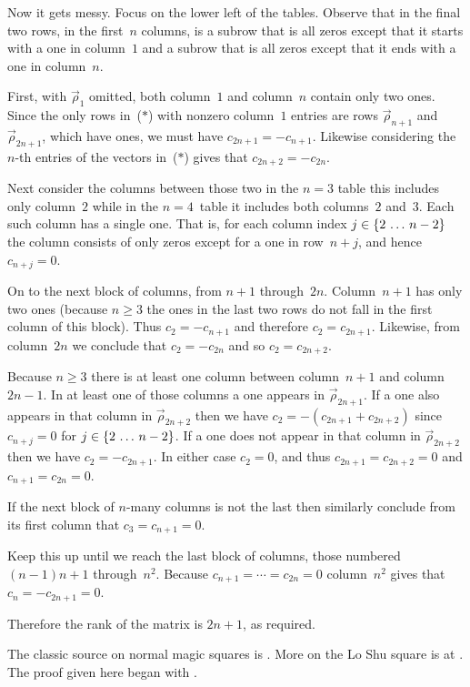 Now it gets messy.
Focus on the lower left of the tables.
Observe that in the final two rows, in the first~$n$ columns, is a subrow that 
is all zeros except that it starts with a one in column~$1$
and a subrow that is all zeros except that it ends with a one
in column~$n$.

First, with $\vec{\rho}_1$ omitted, both column~$1$ and column~$n$ contain only 
two ones.
Since the only rows in~($*$) with nonzero column~$1$ entries 
are rows $\vec{\rho}_{n+1}$ and $\vec{\rho}_{2n+1}$, which have ones, 
we must have $c_{2n+1}=-c_{n+1}$.
Likewise considering the $n$-th entries of the vectors in~($*$) gives that
$c_{2n+2}=-c_{2n}$.

Next consider the columns between those two\Dash
in the $n=3$ table this includes only column~$2$ while 
in the $n=4$~table it includes both columns~$2$ and~$3$.
Each such column has a single one.
That is, for each column index $j\in\mbox{$\{2\,\ldots\, n-2\}$}$
the column consists of only zeros except for a one in row~$n+j$, 
and hence $c_{n+j}=0$.

On to the next block of columns, from $n+1$ through~$2n$.
Column~$n+1$ has only two ones (because $n\geq 3$ the ones
in the last two rows do not fall in the first column of this
block). 
Thus $c_2=-c_{n+1}$
and therefore $c_2=c_{2n+1}$.
Likewise, from column~$2n$ we conclude that $c_2=-c_{2n}$
and so $c_2=c_{2n+2}$.  

Because $n\geq 3$
there is at least one column between column~$n+1$ and column~$2n-1$.
In at least one of those columns a one appears in $\vec{\rho}_{2n+1}$.
If a one also appears in that column in $\vec{\rho}_{2n+2}$ then we have 
$c_2=-(c_{2n+1}+c_{2n+2})$ 
since $c_{n+j}=0$ for $j\in\mbox{$\{2\,\ldots\, n-2\}$}$.
If a one does not appear in that column in $\vec{\rho}_{2n+2}$
then we have $c_2=-c_{2n+1}$.
In either case $c_2=0$, and thus 
$c_{2n+1}=c_{2n+2}=0$ and  
$c_{n+1}=c_{2n}=0$.

If the next block of $n$-many columns is not the last then similarly
conclude from its 
first column that $c_3=c_{n+1}=0$.

Keep this up until we reach the last block of columns, those numbered
$(n-1)n+1$ through~$n^2$.
Because $c_{n+1}=\cdots=c_{2n}=0$ column~$n^2$ 
gives that $c_{n}=-c_{2n+1}=0$.

Therefore the rank of the matrix is $2n+1$, as required.

\medskip
The classic source on normal magic squares is \cite{Ball}.
More on the Lo Shu square is at \cite{WikipediaLoShuSquare}.
The proof given here began with \cite{Ward}.

